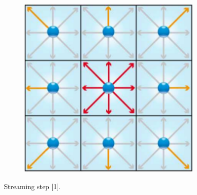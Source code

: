 \begin{figure}[H]
\begin{subfigure}[h]{0.3\textwidth}
    \includegraphics[width=\textwidth]{img/fig7-2.png}
  \end{subfigure}
  \caption{Streaming step [1].}
\end{figure}
